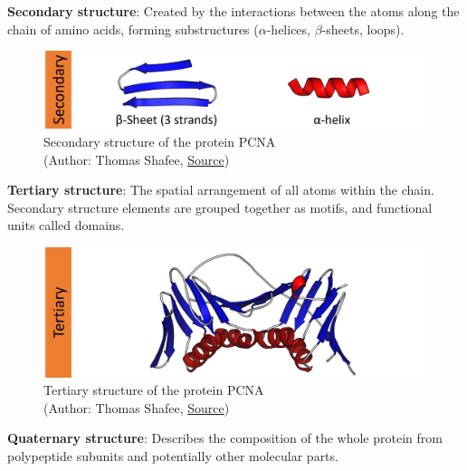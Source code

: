 \textbf{Secondary structure}: Created by the interactions between the atoms along the chain of amino acids, forming substructures ($\alpha$-helices, $\beta$-sheets, loops).

\begin{figure}[H]
    \centering
    \includegraphics[width=\textwidth]{figures/bioinformatics/protein_structure_secondary.png}
    \caption{Secondary structure of the protein PCNA\\(Author: Thomas Shafee, \href{https://en.wikipedia.org/wiki/File:Protein\_structure\_(full).png}{Source})}
\end{figure}

\textbf{Tertiary structure}: The spatial arrangement of all atoms within the chain. Secondary structure elements are grouped together as motifs, and functional units called domains.

\begin{figure}[H]
    \centering
    \includegraphics[width=\textwidth]{figures/bioinformatics/protein_structure_tertiary.png}
    \caption{Tertiary structure of the protein PCNA\\(Author: Thomas Shafee, \href{https://en.wikipedia.org/wiki/File:Protein\_structure\_(full).png}{Source})}
\end{figure}

\textbf{Quaternary structure}: Describes the composition of the whole protein from polypeptide subunits and potentially other molecular parts.

